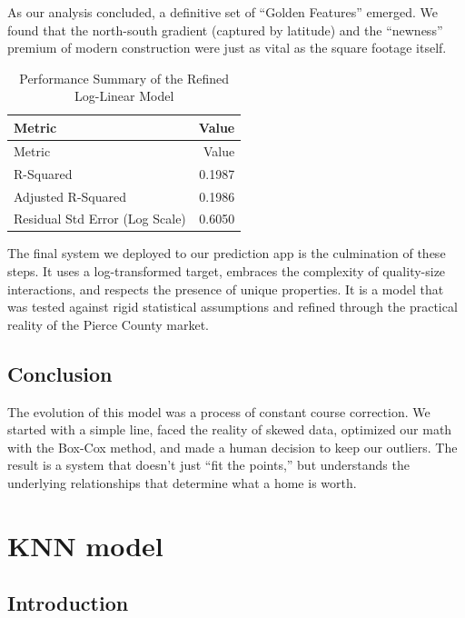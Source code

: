 \documentclass[
  english,
  letterpaper,
  DIV=11,
  numbers=noendperiod]{scrreprt}
\begin{document}
As our analysis concluded, a definitive set of ``Golden Features''
emerged. We found that the north-south gradient (captured by latitude)
and the ``newness'' premium of modern construction were just as vital as
the square footage itself.

\begin{longtable}[]{@{}lr@{}}
\caption{Performance Summary of the Refined Log-Linear
Model}\tabularnewline
\toprule\noalign{}
Metric & Value \\
\midrule\noalign{}
\endfirsthead
\toprule\noalign{}
Metric & Value \\
\midrule\noalign{}
\endhead
\bottomrule\noalign{}
\endlastfoot
R-Squared & 0.1987 \\
Adjusted R-Squared & 0.1986 \\
Residual Std Error (Log Scale) & 0.6050 \\
\end{longtable}

The final system we deployed to our prediction app is the culmination of
these steps. It uses a log-transformed target, embraces the complexity
of quality-size interactions, and respects the presence of unique
properties. It is a model that was tested against rigid statistical
assumptions and refined through the practical reality of the Pierce
County market.

\section{Conclusion}\label{conclusion-1}

The evolution of this model was a process of constant course correction.
We started with a simple line, faced the reality of skewed data,
optimized our math with the Box-Cox method, and made a human decision to
keep our outliers. The result is a system that doesn't just ``fit the
points,'' but understands the underlying relationships that determine
what a home is worth.


\chapter{KNN model}\label{knn-model}

\section{Introduction}\label{introduction-2}
\end{document}
